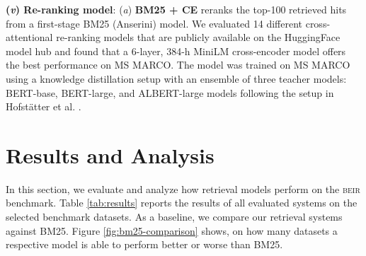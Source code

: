 \documentclass{article}
\newcommand{\custo}[1]{\textsc{\normalsize #1}}
\newcommand{\beir}{\custo{beir}\xspace}
\begin{document}
\textbf{(\emph{v}) Re-ranking model}: (\emph{a}) \textbf{BM25 + CE}\label{sec:electra_model} \cite{NEURIPS2020_3f5ee243} reranks the top-100 retrieved hits from a first-stage BM25 (Anserini) model. We evaluated 14 different cross-attentional re-ranking models that are publicly available on the HuggingFace model hub and found that a 6-layer, 384-h MiniLM \cite{NEURIPS2020_3f5ee243} cross-encoder model offers the best performance on MS MARCO. The model was trained on MS MARCO using a knowledge distillation setup with an ensemble of three teacher models: BERT-base, BERT-large, and ALBERT-large models following the setup in Hofstätter et al. \cite{hofstatter2021improving}.



\vspace{-3mm}
\section{Results and Analysis}
\vspace{-2mm}

In this section, we evaluate and analyze how retrieval models perform on the \beir benchmark. Table \ref{tab:results} reports the results of all evaluated systems on the selected benchmark datasets. As a baseline, we compare our retrieval systems against BM25. Figure \ref{fig:bm25-comparison} shows, on how many datasets a respective model is able to perform better or worse than BM25.
\end{document}
